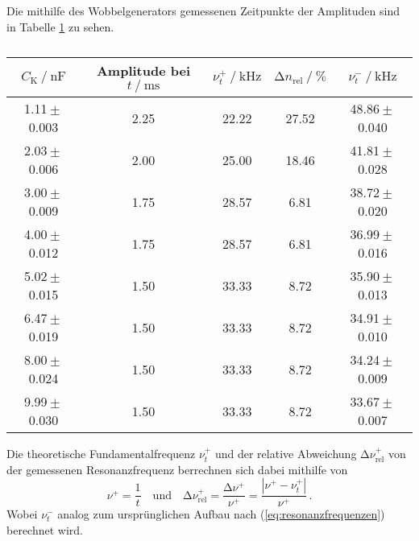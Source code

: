 Die mithilfe des Wobbelgenerators gemessenen Zeitpunkte der Amplituden sind in Tabelle \ref{tab:amplituden} zu sehen.
\begin{table}[H]
    \centering
    \caption{}
    \label{tab:amplituden}
    \begin{tabular}{c c c c c}
        \toprule
        ${C_\text{K}} \mathbin{/} \unit{\nano\farad}$ &
        {Amplitude bei $t \mathbin{/} \unit{\milli\second}$} &
        $\nu^+_{t} \mathbin{/} \unit{\kilo\hertz}$ &
        $\increment n_{\text{rel}} \mathbin{/} \unit{\percent}$ &
        $\nu^-_{t} \mathbin{/} \unit{\kilo\hertz}$ \\
        \midrule
           1.11${}\pm{}$0.003 &      2.25 &    22.22 &  27.52 & 48.86${}\pm{}$0.040 \\
           2.03${}\pm{}$0.006 &      2.00 &    25.00 &  18.46 & 41.81${}\pm{}$0.028 \\
           3.00${}\pm{}$0.009 &      1.75 &    28.57 &   6.81 & 38.72${}\pm{}$0.020 \\
           4.00${}\pm{}$0.012 &      1.75 &    28.57 &   6.81 & 36.99${}\pm{}$0.016 \\
           5.02${}\pm{}$0.015 &      1.50 &    33.33 &   8.72 & 35.90${}\pm{}$0.013 \\
           6.47${}\pm{}$0.019 &      1.50 &    33.33 &   8.72 & 34.91${}\pm{}$0.010 \\
           8.00${}\pm{}$0.024 &      1.50 &    33.33 &   8.72 & 34.24${}\pm{}$0.009 \\
           9.99${}\pm{}$0.030 &      1.50 &    33.33 &   8.72 & 33.67${}\pm{}$0.007 \\
        \bottomrule
        \end{tabular}
\end{table}

Die theoretische Fundamentalfrequenz $\nu^+_{t}$ und der relative Abweichung $\increment \nu^+_{\text{rel}}$
von der gemessenen Resonanzfrequenz berrechnen sich dabei mithilfe von
\begin{equation*}
    \nu^+ = \frac {1} {t} 
    \quad\text{und}\quad 
    \increment \nu^+_{\text{rel}} = \frac{\increment \nu^+}{\nu^+}=\frac{\left|\nu^+-\nu^+_{t}\right|}{\nu^+} \, .
\end{equation*}
Wobei $\nu^-_{t}$ analog zum ursprünglichen Aufbau nach (\ref{eq:resonanzfrequenzen}) berechnet wird.